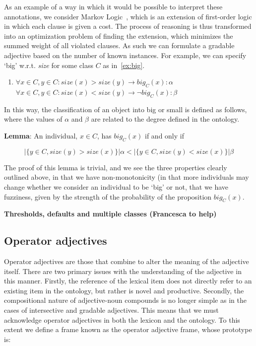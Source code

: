 \documentclass[11pt]{article}
\begin{document}
As an example of a way in which it would be possible to interpret these 
annotations, we consider Markov Logic~\cite{richardson2006markov}, which is an 
extension of first-order logic in which each clause is given a cost. The process 
of reasoning is thus transformed into an optimization problem of finding the 
extension, which minimizes the summed weight of all violated clauses. As such we
can formulate a gradable adjective based on the number of known instances. 
For example, we can specify `big' w.r.t. \emph{size} for some class $C$ as in~\ref{ex:big}.
%
\begin{enumerate}[resume]
\item $\forall x \in C, y \in C : size(x) > size(y) \rightarrow big_C(x) : \alpha$ \\
$\forall x \in C, y \in C : size(x) < size(y) \rightarrow \neg big_C(x) : \beta$
\label{ex:big}
\end{enumerate}
%
In this way, the classification of an object into big or small is defined as follows, 
where the values of $\alpha$ and $\beta$ are related to the degree defined
in the ontology.

\noindent\textbf{Lemma}: An individual, $x \in C$, has $big_C(x)$ if and only if 

$$|\{y \in C, size(y) > size(x)\}| \alpha < |\{y \in C, size(y) < size(x)\}| \beta$$

The proof of this lemma is trivial, and we see the three properties clearly 
outlined above, in that we have non-monotonicity (in that more individuals may
 change whether we consider an individual to be `big' or not, that we have 
fuzziness, given by the strength of the probability of the proposition 
$big_C(x)$.

\textbf{Thresholds, defaults and multiple classes (Francesca to help)}

\subsection{Operator adjectives}

Operator adjectives are those that combine to alter the meaning of the adjective itself. 
There are two primary issues with the understanding of the adjective in this manner. 
Firstly, the reference of the lexical item does not directly refer to an existing item 
in the ontology, but rather is novel and productive. Secondly, the compositional nature 
of adjective-noun compounds is no longer simple as in the cases of intersective and gradable adjectives. 
This means that we must acknowledge operator adjectives in both the lexicon and the ontology. 
To this extent we define a frame known as the operator adjective frame, whose prototype is:
\end{document}
